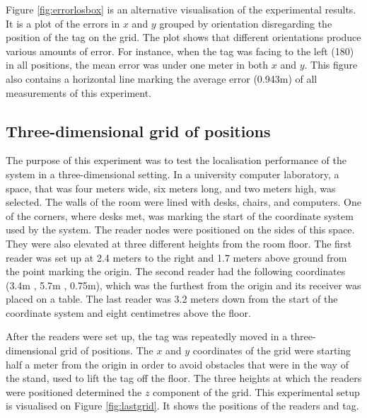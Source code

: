 Figure \ref{fig:errorlosbox} is an alternative visualisation of the experimental results. It is a plot of the errors in $x$ and $y$ grouped by orientation disregarding the position of the tag on the grid. The plot shows that different orientations produce various amounts of error. For instance, when the tag was facing to the left (180\textdegree) in all positions, the mean error was under one meter in both $x$ and $y$. This figure also contains a horizontal line marking the average error (0.943m) of all measurements of this experiment.


\subsection{Three-dimensional grid of positions}

The purpose of this experiment was to test the localisation performance of the system in a three-dimensional setting. In a university computer laboratory, a space, that was four meters wide, six meters long, and two meters high, was selected. The walls of the room were lined with desks, chairs, and computers. One of the corners, where desks met, was marking the start of the coordinate system used by the system. The reader nodes were positioned on the sides of this space. They were also elevated at three different heights from the room floor. The first reader was set up at 2.4 meters to the right and 1.7 meters above ground from the point marking the origin. The second reader had the following coordinates (3.4m , 5.7m , 0.75m), which was the furthest from the origin and its receiver was placed on a table. The last reader was 3.2 meters down from the start of the coordinate system and eight centimetres above the floor.

After the readers were set up, the tag was repeatedly moved in a three-dimensional grid of positions. The $x$ and $y$ coordinates of the grid were starting half a meter from the origin in order to avoid obstacles that were in the way of the stand, used to lift the tag off the floor. The three heights at which the readers were positioned determined the $z$ component of the grid. This experimental setup is visualised on Figure \ref{fig:lastgrid}. It shows the positions of the readers and tag.

